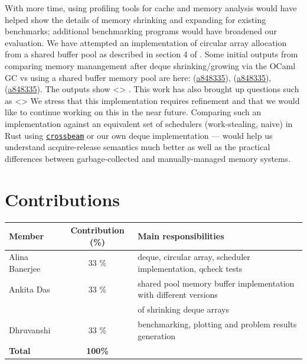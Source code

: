 \documentclass[11pt,a4paper]{article}
\begin{document}
With more time, using profiling tools for cache and memory analysis would have
helped show the details of memory shrinking and expanding for existing
benchmarks; additional benchmarking programs would have broadened our evaluation.
We have attempted an implementation of circular array allocation from a shared
buffer pool as described in section 4 of \cite{chase2005dynamic}. Some initial
outputs from comparing memory manangement after deque shrinking/growing via the
OCaml GC vs using a shared buffer memory pool are here:
(\href{https://github.com/alinab/work-steal/blob/shared-mem-pool-work/work-steal/outputs/mergesort_shrink_shared0_fixed_workers.png}{a848335}),
(\href{https://github.com/alinab/work-steal/blob/shared-mem-pool-work/work-steal/outputs/mergesort_shrink_shared0_resize_ops.png}{a848335}),
(\href{https://github.com/alinab/work-steal/blob/shared-mem-pool-work/work-steal/outputs/mergesort_shrink_shared0_varying_workers.png}{a848335}).
The outputs show <> . This work has also brought up questions such as <>
We stress that this implementation requires refinement and that we would like to
continue working on this in the near future. Comparing such an implementation
against an equivalent set of schedulers (work-stealing, naive) in Rust using
\href{https://docs.rs/crossbeam-deque/latest/crossbeam_deque/}{\texttt{crossbeam}}
or our own deque implementation — would help us understand acquire-release
semantics much better as well as the practical differences between
garbage-collected and manually-managed memory systems.

\section*{Contributions}
\label{sec:contributions}


\begin{center}
\begin{tabular}{@{}lcl@{}}
\toprule
\textbf{Member} & \textbf{Contribution (\%)} & \textbf{Main responsibilities} \\
\midrule
Alina Banerjee  & 33 \% & deque, circular array, scheduler implementation,
                          qcheck tests\\
Ankita Das      & 33 \% & shared pool memory buffer implementation with
different versions \\ & & of shrinking deque arrays \\
Dhruvanshi      & 33 \% & benchmarking, plotting and problem results generation\\
\midrule
\textbf{Total} & \textbf{100\%} & \\
\bottomrule
\end{tabular}
\end{center}



\end{document}
